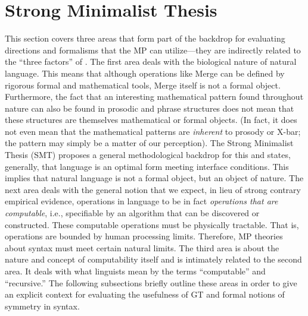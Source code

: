 \documentclass[11pt,twoside]{article}
\theoremstyle{plain}
\numberwithin{equation}{section}
\theoremstyle{definition}
\newtheorem{phrase string}{Phrase String}
\begin{document}
\section{Strong Minimalist Thesis}
This section covers three areas that form part of the backdrop for evaluating directions and formalisms that the MP can utilize---they are indirectly related to the ``three factors'' of \cite{chomsky05threefactors}. The first area deals with the biological nature of natural language. This means that although operations like Merge can be defined by rigorous formal and mathematical tools, Merge itself is not a formal object. Furthermore, the fact that an interesting mathematical pattern found throughout nature can also be found in prosodic and phrase structures does not mean that these structures are themselves mathematical or formal objects. (In fact, it does not even mean that the mathematical patterns are \textsl{inherent} to prosody or X-bar; the pattern may simply be a matter of our perception). The Strong Minimalist Thesis (SMT) proposes a general methodological backdrop for this and states, generally, that language is an optimal form meeting interface conditions. This implies that natural language is not a formal object, but an object of nature. The next area deals with the general notion that we expect, in lieu of strong contrary empirical evidence, operations in language to be in fact \textsl{operations that are computable}, i.e., specifiable by an algorithm that can be discovered or constructed. These computable operations must be physically tractable. That is, operations are bounded by human processing limits. Therefore, MP theories about syntax must meet certain natural limits. The third area is about the nature and concept of computability itself and is intimately related to the second area. It deals with what linguists mean by the terms ``computable'' and ``recursive.'' The following subsections briefly outline these areas in order to give an explicit context for evaluating the usefulness of GT and formal notions of symmetry in syntax.  
\end{document}
